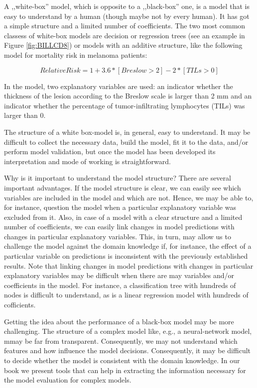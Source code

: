 \documentclass[]{krantz}
\theoremstyle{definition}
\theoremstyle{definition}
\theoremstyle{definition}
\theoremstyle{remark}
\begin{document}
A ,,white-box'' model, which is opposite to a ,,black-box'' one, is a
model that is easy to understand by a human (though maybe not by every
human). It has got a simple structure and a limited number of
coefficients. The two most common classess of white-box models are
decision or regression trees (see an example in Figure
\ref{fig:BILLCD8}) or models with an additive structure, like the
following model for mortality risk in melanoma patients:

\[
RelativeRisk = 1 + 3.6 * [Breslow > 2] - 2 * [TILs > 0] 
\]

In the model, two explanatory variables are used: an indicator whether
the thickness of the lesion according to the Breslow scale is larger
than 2 mm and an indicator whether the percentage of tumor-infiltrating
lymphocytes (TILs) was larger than 0.

The structure of a white box-model is, in general, easy to understand.
It may be difficult to collect the necessary data, build the model, fit
it to the data, and/or perform model validation, but once the model has
been developed its interpretation and mode of working is
straightforward.

Why is it important to understand the model structure? There are several
important advantages. If the model structure is clear, we can easily see
which variables are included in the model and which are not. Hence, we
may be able to, for instance, question the model when a particular
explanatory variable was excluded from it. Also, in case of a model with
a clear structure and a limited number of coefficients, we can easily
link changes in model predictions with changes in particular explanatory
variables. This, in turn, may allow us to challenge the model against
the domain knowledge if, for instance, the effect of a particular
variable on predictions is inconsistent with the previously established
results. Note that linking changes in model predictions with changes in
particular explanatory variables may be difficult when there are may
variables and/or coefficients in the model. For instance, a
classification tree with hundreds of nodes is difficult to understand,
as is a linear regression model with hundreds of cofficients.

Getting the idea about the performance of a black-box model may be more
challenging. The structure of a complex model like, e.g., a
neural-network model, mmay be far from transparent. Consequently, we may
not understand which features and how influence the model decisions.
Consequently, it may be difficult to decide whether the model is
consistent with the domain knowledge. In our book we present tools that
can help in extracting the information necessary for the model
evaluation for complex models.
\end{document}
